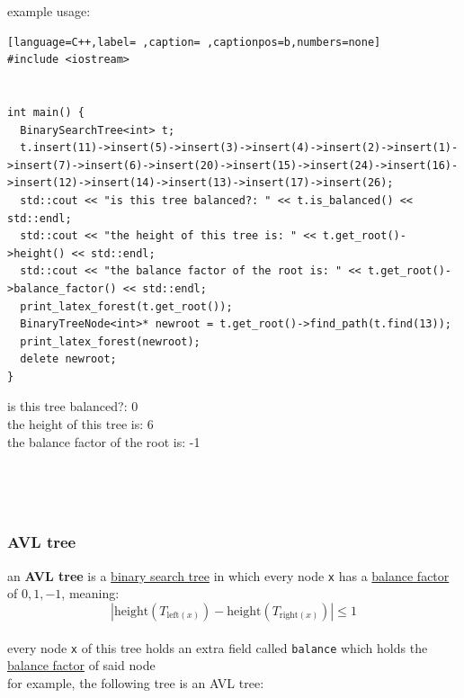 \documentclass[a4paper,12pt]{article}
\begin{document}
example usage:\\[0pt]

\begin{lstlisting}[language=C++,label= ,caption= ,captionpos=b,numbers=none]
#include <iostream>


int main() {
  BinarySearchTree<int> t;
  t.insert(11)->insert(5)->insert(3)->insert(4)->insert(2)->insert(1)->insert(7)->insert(6)->insert(20)->insert(15)->insert(24)->insert(16)->insert(12)->insert(14)->insert(13)->insert(17)->insert(26);
  std::cout << "is this tree balanced?: " << t.is_balanced() << std::endl;
  std::cout << "the height of this tree is: " << t.get_root()->height() << std::endl;
  std::cout << "the balance factor of the root is: " << t.get_root()->balance_factor() << std::endl;
  print_latex_forest(t.get_root());
  BinaryTreeNode<int>* newroot = t.get_root()->find_path(t.find(13));
  print_latex_forest(newroot);
  delete newroot;
}
\end{lstlisting}

is this tree balanced?: 0\\[0pt]
the height of this tree is: 6\\[0pt]
the balance factor of the root is: -1\\[0pt]
\begin{center}

\end{center}\\[0pt]

\begin{center}

\end{center}\\[0pt]
\subsubsection{AVL tree}
\label{sec:orge9da911}
an \textbf{AVL tree} is a \hyperref[sec:orge1ff544]{binary search tree} in which every node \texttt{x} has a \hyperref[sec:org98c9b00]{balance factor} of \(0,1,-1\), meaning:\\[0pt]
\[
  \left|\text{height}\left(T_{\text{left}(x)}\right) - \text{height}\left(T_{\text{right}(x)}\right)\right| \leq 1
\]\\[0pt]
every node \texttt{x} of this tree holds an extra field called \texttt{balance} which holds the \hyperref[sec:org98c9b00]{balance factor} of said node\\[0pt]
for example, the following tree is an AVL tree:\\[0pt]
\end{document}
